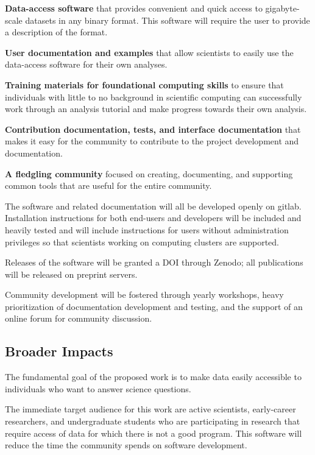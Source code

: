 \textbf{Data-access software} that provides convenient and quick access to gigabyte-scale datasets in any binary format.  This software will require the user to provide a description of the format.

\textbf{User documentation and examples} that allow scientists to easily use the data-access software for their own analyses.

\textbf{Training materials for foundational computing skills} to ensure that individuals with little to no background in scientific computing can successfully work through an analysis tutorial and make progress towards their own analysis.

\textbf{Contribution documentation, tests, and interface documentation} that makes it easy for the community to contribute to the project development and documentation.

\textbf{A fledgling community} focused on creating, documenting, and supporting common tools that are useful for the entire community.

The software and related documentation will all be developed openly on gitlab.  Installation instructions for both end-users and developers will be included and heavily tested and will include instructions for users without administration privileges so that scientists working on computing clusters are supported.

Releases of the software will be granted a DOI through Zenodo; all publications will be released on preprint servers.

Community development will be fostered through yearly workshops, heavy prioritization of documentation development and testing, and the support of an online forum for community discussion.

\subsection{Broader Impacts}

The fundamental goal of the proposed work is to make data easily accessible to individuals who want to answer science questions.


The immediate target audience for this work are active scientists, early-career researchers, and undergraduate students who are participating in research that require access of data for which there is not a good program.  This software will reduce the time the community spends on software development.  

